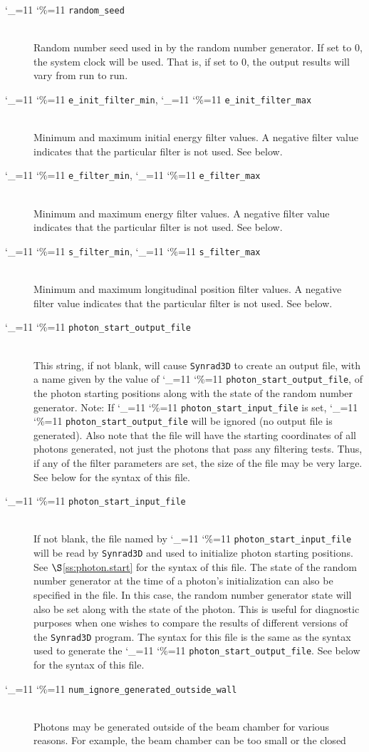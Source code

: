 \documentclass[11pt]{article}
\newcommand{\sref}[1]{$\S$\ref{#1}}
\newcommand{\srthree}{\texttt{Synrad3D}\xspace}
\newcommand\ttcmd{\begingroup\catcode`\_=11 \catcode`\%=11 \dottcmd}
\newcommand\dottcmd[1]{\texttt{#1}\endgroup}
\newcommand{\vn}{\ttcmd}
\newcommand{\Newline}{\hfil \\}
\begin{document}
\begin{description}
  \item[\vn{random_seed}] \Newline
Random number seed used in by the random number generator. If set to 0, the system clock
will be used. That is, if set to 0, the output results will vary from run to run. 
  \item[\vn{e_init_filter_min}, \vn{e_init_filter_max}] \Newline
Minimum and maximum initial energy filter values. A negative filter value
indicates that the particular filter is not used. See below.
  \item[\vn{e_filter_min}, \vn{e_filter_max}] \Newline
Minimum and maximum energy filter values. A negative filter value
indicates that the particular filter is not used. See below.
  \item[\vn{s_filter_min}, \vn{s_filter_max}] \Newline
Minimum and maximum longitudinal position filter values. A negative filter value
indicates that the particular filter is not used. See below.
  \item[\vn{photon_start_output_file}] \Newline
This string, if not blank, will cause \srthree to create an output
file, with a name given by the value of \vn{photon_start_output_file},
of the photon starting positions along with the state of the random
number generator. Note: If \vn{photon_start_input_file} is set,
\vn{photon_start_output_file} will be ignored (no output file is
generated). Also note that the file will have the starting coordinates
of all photons generated, not just the photons that pass any filtering
tests. Thus, if any of the filter parameters are set, the size of the
file may be very large. See below for the syntax of this file.
  \item[\vn{photon_start_input_file}] \Newline
If not blank, the file named by \vn{photon_start_input_file}
will be read by \srthree and used to initialize photon
starting positions. See \sref{ss:photon.start} for the syntax of this file.
The state of the random number generator at the time of a photon's
initialization can also be specified in the file. In this case, the
random number generator state will also be set along with the state of
the photon. This is useful for diagnostic purposes when one wishes to
compare the results of different versions of the \srthree program. The
syntax for this file is the same as the syntax used to generate the
\vn{photon_start_output_file}. See below for the syntax of this file.
  \item[\vn{num_ignore_generated_outside_wall}] \Newline
Photons may be generated outside of the beam chamber for various
reasons. For example, the beam chamber can be too small or the closed

\end{description}
\end{document}
